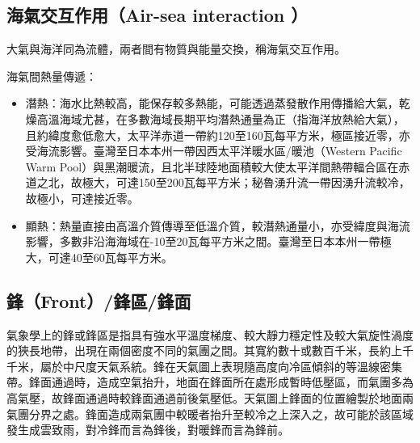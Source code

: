 \documentclass[a4paper,12pt]{report}
\begin{document}
\begin{itemize}
\subsection{海氣交互作用（Air-sea interaction ）}
大氣與海洋同為流體，兩者間有物質與能量交換，稱海氣交互作用。

海氣間熱量傳遞：
\begin{itemize}
\item 潛熱：海水比熱較高，能保存較多熱能，可能透過蒸發散作用傳播給大氣，乾燥高溫海域尤甚，在多數海域長期平均潛熱通量為正（指海洋放熱給大氣），且約緯度愈低愈大，太平洋赤道一帶約120至160瓦每平方米，極區接近零，亦受海流影響。臺灣至日本本州一帶因西太平洋暖水區/暖池（Western Pacific Warm Pool）與黑潮暖流，且北半球陸地面積較大使太平洋間熱帶輻合區在赤道之北，故極大，可達150至200瓦每平方米；秘魯湧升流一帶因湧升流較冷，故極小，可達接近零。
\item 顯熱：熱量直接由高溫介質傳導至低溫介質，較潛熱通量小，亦受緯度與海流影響，多數非沿海海域在-10至20瓦每平方米之間。臺灣至日本本州一帶極大，可達40至60瓦每平方米。
\end{itemize}
\subsection{鋒（Front）/鋒區/鋒面}
氣象學上的鋒或鋒區是指具有強水平溫度梯度、較大靜力穩定性及較大氣旋性渦度的狹長地帶，出現在兩個密度不同的氣團之間。其寬約數十或數百千米，長約上千千米，屬於中尺度天氣系統。鋒在天氣圖上表現隨高度向冷區傾斜的等溫線密集帶。鋒面通過時，造成空氣抬升，地面在鋒面所在處形成暫時低壓區，而氣團多為高氣壓，故鋒面通過時較鋒面通過前後氣壓低。天氣圖上鋒面的位置繪製於地面兩氣團分界之處。鋒面造成兩氣團中較暖者抬升至較冷之上深入之，故可能於該區域發生成雲致雨，對冷鋒而言為鋒後，對暖鋒而言為鋒前。

\end{itemize}
\end{document}
